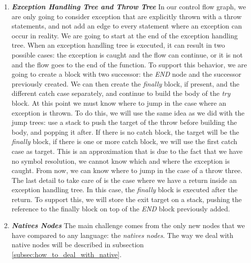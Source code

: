 \begin{enumerate}
	\item \textbf{\textit{Exception Handling Tree and Throw Tree}} \newline 
	\label{subsubsec:exception_handling_cfg}
	In our control flow graph, we are only going to consider exception that are explicitly thrown with a throw statements, and not add an edge to every statement where an exception can occur in reality. \newline
	We are going to start at the end of the exception handling tree. 
	When an exception handling tree is executed, it can result in two possible cases: the exception is caught and the flow can continue, or it is not and the flow goes to the end of the function. 
	To support this behavior, we are going to create a block with two successor: the \emph{END} node and the successor previously created. \newline
	We can then create the \emph{finally} block, if present, and the different catch case separately, and continue to build the body of the \emph{try} block. 
	At this point we must know where to jump in the case where an exception is thrown. 
	To do this, we will use the same idea as we did with the jump trees: use a stack to push the target of the throw before building the body, and popping it after. 
	If there is no catch block, the target will be the \emph{finally} block, if there is one or more catch block, we will use the first catch case as target. 
	This is an approximation that is due to the fact that we have no symbol resolution, we cannot know which and where the exception is caught.
	From now, we can know where to jump in the case of a throw three.\newline
	The last detail to take care of is the case where we have a return inside an exception handling tree.
	In this case, the \emph{finally} block is executed after the return. 
	To support this, we will store the exit target on a stack, pushing the reference to the finally block on top of the \emph{END} block previously added.
	
	\item \textbf{\textit{Natives Nodes}} \newline 
	\label{subsubsec:native_nodes_cfg}
	The main challenge comes from the only new nodes that we have compared to any language: the \emph{natives nodes}. 
	The way we deal with native nodes will be described in subsection \ref{subsec:how_to_deal_with_native}.
\end{enumerate}

